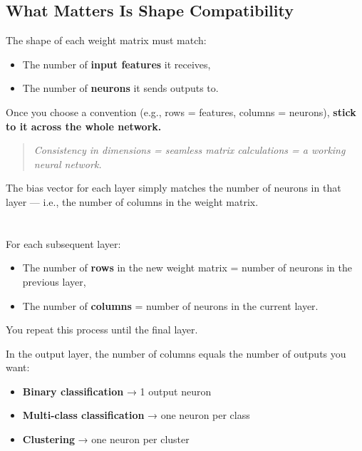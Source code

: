 \documentclass[11pt]{article}
\begin{document}
\subsection*{What Matters Is Shape Compatibility}

The shape of each weight matrix must match:

\begin{itemize}
  \item The number of \textbf{input features} it receives,
  \item The number of \textbf{neurons} it sends outputs to.
\end{itemize}

\vspace{0.5em}

Once you choose a convention (e.g., rows = features, columns = neurons),  
\textbf{stick to it across the whole network.}

\begin{quote}
\textit{Consistency in dimensions = seamless matrix calculations = a working neural network.}
\end{quote}

\vspace{0.5em}

The bias vector for each layer simply matches the number of neurons in that layer —  
i.e., the number of columns in the weight matrix.

\vspace{1.5em}

\section*{}

For each subsequent layer:

\begin{itemize}
  \item The number of \textbf{rows} in the new weight matrix = number of neurons in the previous layer,
  \item The number of \textbf{columns} = number of neurons in the current layer.
\end{itemize}

You repeat this process until the final layer.

\vspace{1em}

In the output layer, the number of columns equals the number of outputs you want:

\begin{itemize}
  \item \textbf{Binary classification} → 1 output neuron
  \item \textbf{Multi-class classification} → one neuron per class
  \item \textbf{Clustering} → one neuron per cluster
\end{itemize}
\end{document}
